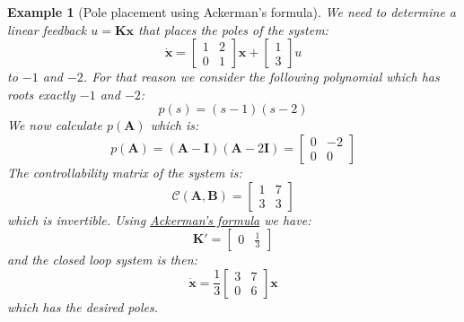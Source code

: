 \documentclass[a4paper,10pt,oneside]{book}
\newtheorem{example}{Example}
\begin{document}
\begin{example}[Pole placement using Ackerman's formula]
 We need to determine a linear feedback $u=\mathbf{Kx}$ that places the poles of the system:
 \begin{equation}
  \dot{\mathbf{x}}=\left[ {\begin{array}{cc}
      1&2\\0&1
\end{array} } \right]\mathbf{x}+\left[ {\begin{array}{c}     
1\\3
\end{array} } \right]u
 \end{equation}
to $-1$ and $-2$. For that reason we consider the following polynomial which has roots exactly $-1$ and $-2$:
\begin{equation}
 p(s)=(s-1)(s-2)
\end{equation}
We now calculate $p(\mathbf{A})$ which is:
\begin{equation}
 p(\mathbf{A})=(\mathbf{A}-\mathbf{I})(\mathbf{A}-2\mathbf{I})=\left[ {\begin{array}{cc}
0&-2\\0&0
\end{array} } \right]
\end{equation}
The controllability matrix of the system is:
\begin{equation}
 \mathcal{C}(\mathbf{A},\mathbf{B})=\left[ {\begin{array}{cc}
1&7\\3&3
\end{array} } \right]
\end{equation}
which is invertible. Using \hyperlink{prop:AckermansFormula}{Ackerman's formula} we have:
\begin{equation}
 \mathbf{K}'=\left[ {\begin{array}{cc}0&\frac{1}{3}\end{array} } \right]
\end{equation}
and the closed loop system is then:
 \begin{equation}
  \dot{\mathbf{x}}=\frac{1}{3}\left[ {\begin{array}{cc}
      3&7\\0&6
\end{array} } \right]\mathbf{x}
 \end{equation}
which has the desired poles. 
\end{example}
\end{document}
